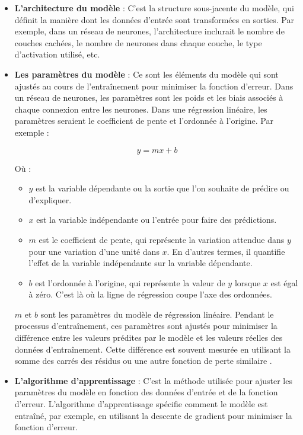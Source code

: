 \begin{itemize}
    \item \textbf{L'architecture du modèle} : C'est la structure sous-jacente du modèle, qui définit la manière dont les données d'entrée sont transformées en sorties. Par exemple, dans un réseau de neurones, l'architecture inclurait le nombre de couches cachées, le nombre de neurones dans chaque couche, le type d'activation utilisé, etc.

    \item \textbf{Les paramètres du modèle} : Ce sont les éléments du modèle qui sont ajustés au cours de l'entraînement pour minimiser la fonction d'erreur. Dans un réseau de neurones, les paramètres sont les poids et les biais associés à chaque connexion entre les neurones. Dans une régression linéaire, les paramètres seraient le coefficient de pente et l'ordonnée à l'origine. Par exemple :

    \begin{equation}
        y = mx + b
    \end{equation}

    Où :

    \begin{itemize}
        \item $y$ est la variable dépendante ou la sortie que l'on souhaite de prédire ou d'expliquer.
        
        \item $x$ est la variable indépendante ou l'entrée pour faire des prédictions.
        
        \item $m$ est le coefficient de pente, qui représente la variation attendue dans  $y$ pour une variation d'une unité dans $x$.  En d'autres termes, il quantifie l'effet de la variable indépendante sur la variable dépendante.
    
        \item $b$ est l'ordonnée à l'origine, qui représente la valeur de $y$ lorsque $x$ est égal à zéro. C'est là où la ligne de régression coupe l'axe des ordonnées.
    \end{itemize}
    
    $m$ et $b$ sont les paramètres du modèle de régression linéaire. Pendant le processus d'entraînement, ces paramètres sont ajustés pour minimiser la différence entre les valeurs prédites par le modèle et les valeurs réelles des données d'entraînement. Cette différence est souvent mesurée en utilisant la somme des carrés des résidus ou une autre fonction de perte similaire \cite{Bonaccorso_2018}.

    \item \textbf{L'algorithme d'apprentissage} : C'est la méthode utilisée pour ajuster les paramètres du modèle en fonction des données d'entrée et de la fonction d'erreur. L'algorithme d'apprentissage spécifie comment le modèle est entraîné, par exemple, en utilisant la descente de gradient pour minimiser la fonction d'erreur.
\end{itemize}

